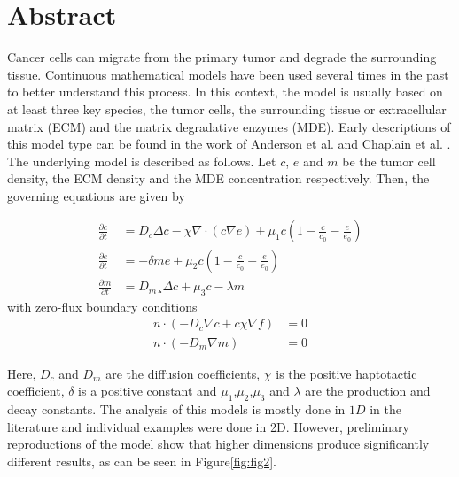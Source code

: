 \clearpage
\section*{Abstract}
Cancer cells can migrate from the primary tumor and degrade the surrounding tissue. 
Continuous mathematical models have been used several times in the past to better 
understand this process. In this context, the model is usually based on at least three 
key species, the tumor cells, the surrounding tissue or extracellular matrix (ECM) and 
the matrix degradative enzymes (MDE). Early descriptions of this model type can be found 
in the work of Anderson et al. \cite{anderson_continuous_1998,anderson_mathematical_2000} 
and Chaplain et al. \cite{anderson_continuous_1998,chaplain_mathematical_2006,chaplain_mathematical_2006-1,franssen_mathematical_2019}. 
The underlying model is described as follows. 
Let $c$, $e$ and $m$ be the tumor cell density, the ECM density and the MDE concentration 
respectively. Then, the governing equations are given by

\begin{align*}
	\frac{\partial c}{\partial t} &= D_c \Delta c - \chi \nabla \cdot (c\nabla e) + \mu_1 c\left(1-\frac{c}{c_0}-\frac{e}{e_0}\right)\\
	\frac{\partial e}{\partial t} &= -\delta m e  + \mu_2 c\left(1-\frac{c}{c_0}-\frac{e}{e_0}\right)\\
	\frac{\partial m}{\partial t} &= D_m¸ \Delta c + \mu_3 c - \lambda m
\end{align*}
with zero-flux boundary conditions 
\begin{align*}
	n\cdot (-D_c \nabla c + c \chi\nabla f) &= 0 \\
	n \cdot (-D_m\nabla m ) &= 0
\end{align*}

\noindent Here, $D_c$ and $D_m$ are the diffusion coefficients, $\chi$ is the positive 
haptotactic coefficient, $\delta$ is a positive constant and $\mu_1$,$\mu_2$,$\mu_3$ and 
$\lambda$ are the production and decay constants. \newline 
The analysis of this models is mostly done in $1D$ in the literature and individual 
examples were done in 2D. However, preliminary reproductions of the model show that 
higher dimensions produce significantly different results, as can be seen in Figure\ref{fig:fig2}.

